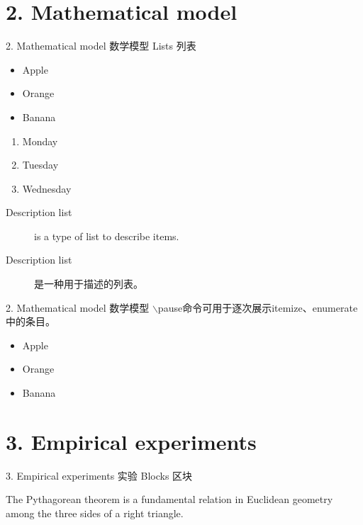\documentclass[CJKutf8,compress]{beamer}
\begin{document}
\begin{CJK*}{UTF8}{gkai}
  \section{2. Mathematical model}
  \label{Sec:model}
  \begin{frame}{2. Mathematical model 数学模型}
    Lists 列表

    \begin{itemize}
    \item Apple
    \item Orange
    \item Banana
    \end{itemize}

    \begin{enumerate}
    \item Monday
    \item Tuesday
    \item Wednesday
    \end{enumerate}

    \begin{description}
    \item[Description list] is a type of list to describe items.
    \item[Description list] 是一种用于描述的列表。
    \end{description}
  \end{frame} %
  
  \begin{frame}{2. Mathematical model 数学模型}
    \alert{$\backslash$pause命令}可用于逐次展示itemize、enumerate中的条目。

    \begin{itemize}
    \pause
    \item Apple
    \pause
    \item Orange
    \pause
    \item Banana
    \end{itemize}
  \end{frame} %
  
  \section{3. Empirical experiments}
  \label{Sec:experiments}
  \begin{frame}{3. Empirical experiments 实验}
    Blocks 区块

      \begin{definition}
        The Pythagorean theorem is a fundamental relation in Euclidean geometry among the three sides of a right triangle.
      \end{definition}


\end{frame}
\end{CJK*}
\end{document}
